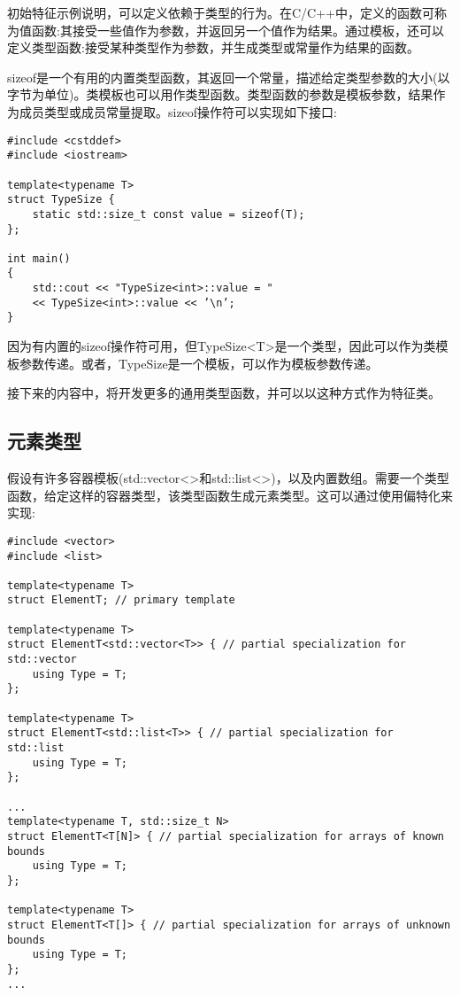 
初始特征示例说明，可以定义依赖于类型的行为。在C/C++中，定义的函数可称为值函数:其接受一些值作为参数，并返回另一个值作为结果。通过模板，还可以定义类型函数:接受某种类型作为参数，并生成类型或常量作为结果的函数。

sizeof是一个有用的内置类型函数，其返回一个常量，描述给定类型参数的大小(以字节为单位)。类模板也可以用作类型函数。类型函数的参数是模板参数，结果作为成员类型或成员常量提取。sizeof操作符可以实现如下接口:

\begin{lstlisting}[style=styleCXX]
#include <cstddef>
#include <iostream>

template<typename T>
struct TypeSize {
	static std::size_t const value = sizeof(T);
};

int main()
{
	std::cout << "TypeSize<int>::value = "
	<< TypeSize<int>::value << ’\n’;
}
\end{lstlisting}

因为有内置的sizeof操作符可用，但TypeSize<T>是一个类型，因此可以作为类模板参数传递。或者，TypeSize是一个模板，可以作为模板参数传递。

接下来的内容中，将开发更多的通用类型函数，并可以以这种方式作为特征类。

\subsection{元素类型}

假设有许多容器模板(std::vector<>和std::list<>)，以及内置数组。需要一个类型函数，给定这样的容器类型，该类型函数生成元素类型。这可以通过使用偏特化来实现:

\begin{lstlisting}[style=styleCXX]
#include <vector>
#include <list>

template<typename T>
struct ElementT; // primary template

template<typename T>
struct ElementT<std::vector<T>> { // partial specialization for std::vector
	using Type = T;
};

template<typename T>
struct ElementT<std::list<T>> { // partial specialization for std::list
	using Type = T;
};

...
template<typename T, std::size_t N>
struct ElementT<T[N]> { // partial specialization for arrays of known bounds
	using Type = T;
};

template<typename T>
struct ElementT<T[]> { // partial specialization for arrays of unknown bounds
	using Type = T;
};
...
\end{lstlisting}

